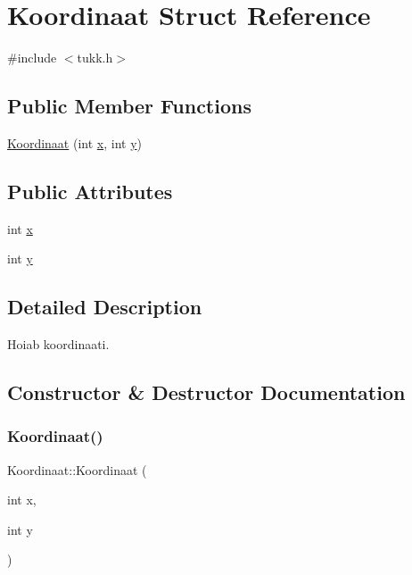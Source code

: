 \hypertarget{struct_koordinaat}{}\section{Koordinaat Struct Reference}
\label{struct_koordinaat}


{\ttfamily \#include $<$tukk.\+h$>$}

\subsection*{Public Member Functions}
\begin{DoxyCompactItemize}
\item 
\mbox{\hyperlink{struct_koordinaat_a8ca533689b87fcd5d06cfebbf15cdc77}{Koordinaat}} (int \mbox{\hyperlink{struct_koordinaat_a974b834055d2848dbb494abe6265d46d}{x}}, int \mbox{\hyperlink{struct_koordinaat_af8cb7c06e46ff35565ac7eb3261b7b88}{y}})
\end{DoxyCompactItemize}
\subsection*{Public Attributes}
\begin{DoxyCompactItemize}
\item 
int \mbox{\hyperlink{struct_koordinaat_a974b834055d2848dbb494abe6265d46d}{x}}
\item 
int \mbox{\hyperlink{struct_koordinaat_af8cb7c06e46ff35565ac7eb3261b7b88}{y}}
\end{DoxyCompactItemize}


\subsection{Detailed Description}
Hoiab koordinaati. 

\subsection{Constructor \& Destructor Documentation}
\mbox{\label{struct_koordinaat_a8ca533689b87fcd5d06cfebbf15cdc77}} 
\subsubsection{\texorpdfstring{Koordinaat()}{Koordinaat()}}
{\footnotesize\ttfamily Koordinaat\+::\+Koordinaat (\begin{DoxyParamCaption}\item[{int}]{x,  }\item[{int}]{y }\end{DoxyParamCaption})\hspace{0.3cm}{\ttfamily [inline]}}


